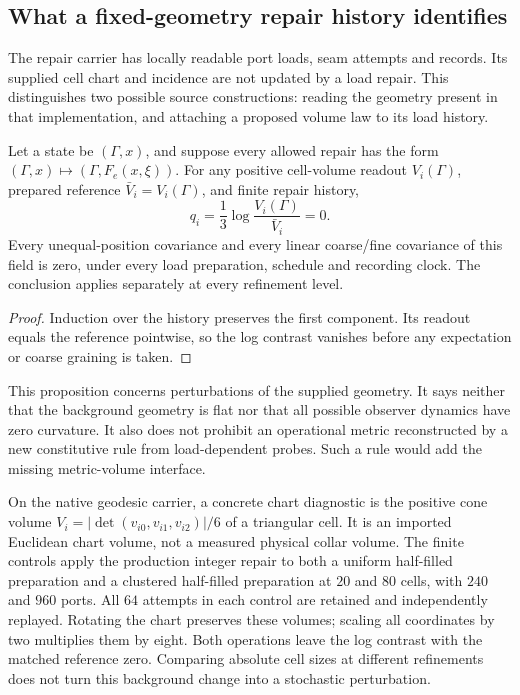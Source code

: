 \subsection{What a fixed-geometry repair history identifies}
\label{subsec:native-geometric-source-identification}

The repair carrier has locally readable port loads, seam attempts and records.
Its supplied cell chart and incidence are not updated by a load repair.
This distinguishes two possible source constructions: reading the geometry
present in that implementation, and attaching a proposed volume law
to its load history.

\begin{proposition}
Let a state be \((\Gamma,x)\), and suppose every allowed repair has the form
\((\Gamma,x)\mapsto(\Gamma,F_e(x,\xi))\). For any positive cell-volume
readout \(V_i(\Gamma)\), prepared reference
\(\bar V_i=V_i(\Gamma)\), and finite repair history,
\[
 q_i=\frac13\log\frac{V_i(\Gamma)}{\bar V_i}=0.
\]
Every unequal-position covariance and every linear coarse/fine covariance of
this field is zero, under every load preparation, schedule and recording
clock. The conclusion applies separately at every refinement level.
\end{proposition}
\begin{proof}
Induction over the history preserves the first component. Its readout equals
the reference pointwise, so the log contrast vanishes before any expectation
or coarse graining is taken.
\end{proof}

This proposition concerns perturbations of the supplied geometry. It says
neither that the background geometry is flat nor that all possible observer
dynamics have zero curvature. It also does not prohibit an operational metric
reconstructed by a new constitutive rule from load-dependent probes. Such a
rule would add the missing metric-volume interface.

On the native geodesic carrier, a concrete chart diagnostic is the positive
cone volume \(V_i=|\det(v_{i0},v_{i1},v_{i2})|/6\) of a triangular cell.
It is an imported Euclidean chart volume, not a measured physical collar
volume. The finite controls apply the production integer repair to both a
uniform half-filled preparation and a clustered half-filled preparation at
\(20\) and \(80\) cells, with \(240\) and \(960\) ports. All \(64\)
attempts in each control are retained and independently replayed. Rotating
the chart preserves these volumes; scaling all coordinates by two multiplies
them by eight. Both operations leave the log contrast with the matched
reference zero. Comparing absolute cell sizes at different refinements does
not turn this background change into a stochastic perturbation.

